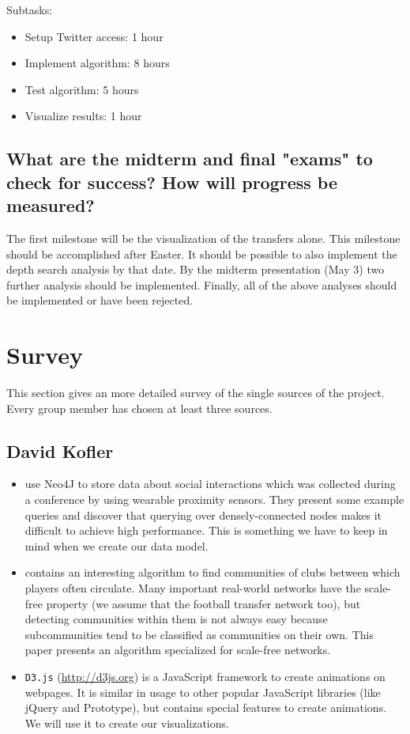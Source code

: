 \documentclass{article}
\begin{document}
Subtasks:
\begin{itemize}
\item Setup Twitter access: 1 hour
\item Implement algorithm: 8 hours
\item Test algorithm: 5 hours
\item Visualize results: 1 hour
\end{itemize}

\subsection{What are the midterm and final "exams" to check for success? How will progress be measured?}

The first milestone will be the visualization of the transfers alone. This milestone should be accomplished after Easter. It should be possible to also implement the depth search analysis by that date. By the midterm presentation (May 3) two further analysis should be implemented. Finally, all of the above analyses should be implemented or have been rejected.

\section{Survey}
This section gives an more detailed survey of the single sources of the project. Every group member has chosen at least three sources.
\subsection{David Kofler}

\begin{itemize}
	\item \cite{Cattuto:2013:TSN:2484425.2484442} use Neo4J to store data about social interactions which was collected during a conference by using wearable proximity sensors. They present some example queries and discover that querying over densely-connected nodes makes it difficult to achieve high performance. This is something we have to keep in mind when we create our data model.

	\item \cite{Jarukasemratana:2013:CDA:2481492.2481527} contains an interesting algorithm to find communities of clubs between which players often circulate. Many important real-world networks have the scale-free property (we assume that the football transfer network too), but detecting communities within them is not always easy because subcommunities tend to be classified as communities on their own. This paper presents an algorithm specialized for scale-free networks.

	\item \verb+D3.js+ (\url{http://d3js.org}) is a JavaScript framework to create animations on webpages. It is similar in usage to other popular JavaScript libraries (like jQuery and Prototype), but contains special features to create animations. We will use it to create our visualizations.
\end{itemize}
\end{document}
